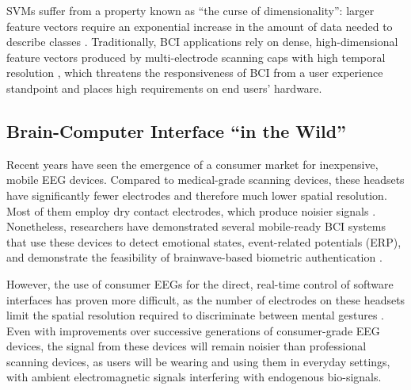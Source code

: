 SVMs suffer from a property known as ``the curse of dimensionality'': larger feature vectors require an exponential increase in the amount of data needed to describe classes \cite{jain_statistical_2000}. Traditionally, BCI applications rely on dense, high-dimensional feature vectors produced by multi-electrode scanning caps with high temporal resolution \cite{lotte_review_2007}, which threatens the responsiveness of BCI from a user experience standpoint and places high requirements on end users' hardware.

\subsection{Brain-Computer Interface ``in the Wild''}

\noindent Recent years have seen the emergence of a consumer market for inexpensive, mobile EEG devices. Compared to medical-grade scanning devices, these headsets have significantly fewer electrodes and therefore much lower spatial resolution. Most of them employ dry contact electrodes, which produce noisier signals \cite{de2014mobile}. Nonetheless, researchers have demonstrated several mobile-ready BCI systems that use these devices to detect emotional states, event-related potentials (ERP), and demonstrate the feasibility of brainwave-based biometric authentication \cite{crowley_evaluating_2010,grierson_better_2011,adams_i_2013,johnson2014}. 


However, the use of consumer EEGs for the direct, real-time control of software interfaces has proven more difficult, as the number of electrodes on these headsets limit the spatial resolution required to discriminate between mental gestures \cite{carrino_self-paced_2012,larsen_classification_2011}. Even with improvements over successive generations of consumer-grade EEG devices, the signal from these devices will remain noisier than professional scanning devices, as users will be wearing and using them in everyday settings, with ambient electromagnetic signals interfering with endogenous bio-signals.

